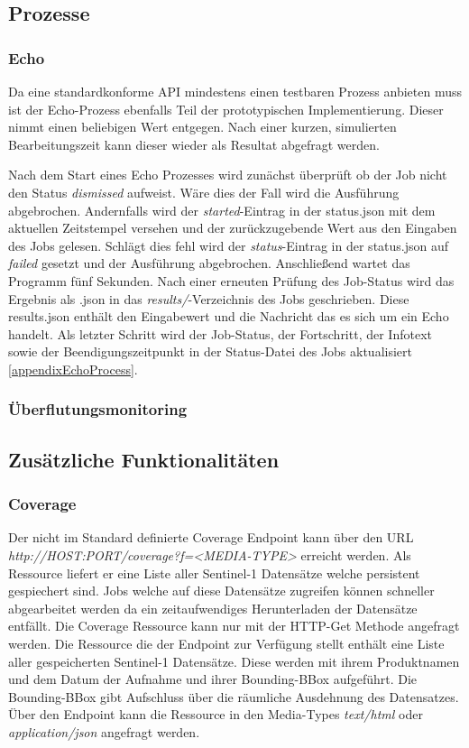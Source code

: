\subsection{Prozesse}
\subsubsection{Echo}
Da eine standardkonforme API mindestens einen testbaren Prozess anbieten muss ist der Echo-Prozess ebenfalls Teil der prototypischen Implementierung. 
Dieser nimmt einen beliebigen Wert entgegen. Nach einer kurzen, simulierten Bearbeitungszeit kann dieser wieder als Resultat abgefragt werden. 

Nach dem Start eines Echo Prozesses wird zunächst überprüft ob der Job nicht den Status \textit{dismissed} aufweist. Wäre dies der Fall wird die Ausführung abgebrochen. 
Andernfalls wird der \textit{started}-Eintrag in der status.json mit dem aktuellen Zeitstempel versehen und der zurückzugebende Wert aus den Eingaben des Jobs gelesen.
Schlägt dies fehl wird der \textit{status}-Eintrag in der status.json auf \textit{failed} gesetzt und der Ausführung abgebrochen. 
Anschließend wartet das Programm fünf Sekunden. Nach einer erneuten Prüfung des Job-Status wird das Ergebnis als .json in das \textit{results/}-Verzeichnis des Jobs geschrieben.
Diese results.json enthält den Eingabewert und die Nachricht das es sich um ein Echo handelt. 
Als letzter Schritt wird der Job-Status, der Fortschritt, der Infotext sowie der Beendigungszeitpunkt in der Status-Datei des Jobs aktualisiert \ref{appendixEchoProcess}. 
\subsubsection{Überflutungsmonitoring}
\subsection{Zusätzliche Funktionalitäten}
\subsubsection{Coverage} 
Der nicht im Standard definierte Coverage Endpoint kann über den URL \textit{http://HOST:PORT/coverage?f=<MEDIA-TYPE>} erreicht werden. Als Ressource liefert er eine Liste aller Sentinel-1 Datensätze welche persistent gespiechert sind. 
Jobs welche auf diese Datensätze zugreifen können schneller abgearbeitet werden da ein zeitaufwendiges Herunterladen der Datensätze entfällt. Die Coverage Ressource kann nur mit der HTTP-Get Methode angefragt werden. 
Die Ressource die der Endpoint zur Verfügung stellt enthält eine Liste aller gespeicherten Sentinel-1 Datensätze. Diese werden mit ihrem Produktnamen und dem Datum der Aufnahme 
und ihrer Bounding-BBox aufgeführt. Die Bounding-BBox gibt Aufschluss über die räumliche Ausdehnung des Datensatzes. 
Über den Endpoint kann die Ressource in den Media-Types \textit{text/html} oder \textit{application/json} angefragt werden. 